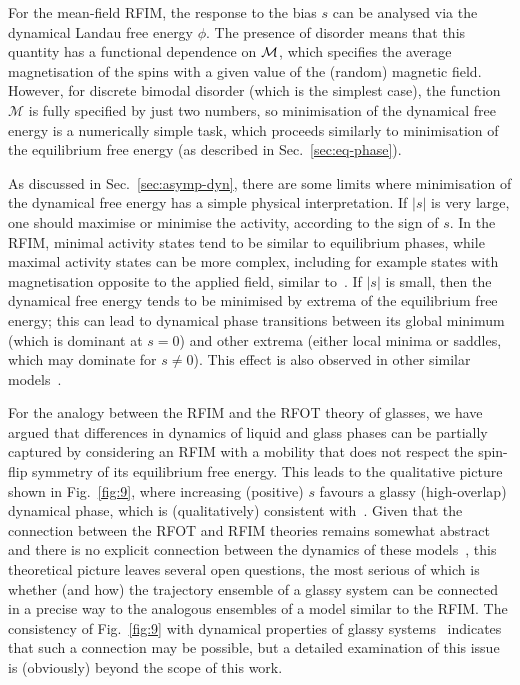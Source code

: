 \documentclass{iopart}
\newcommand{\mdis}[0]{\ensuremath{\mathcal{M}}}
\begin{document}
For the mean-field RFIM, the response to the bias $s$ can be analysed via the dynamical Landau free energy $\phi$.  The presence of disorder means that this quantity has a functional dependence on $\cal M$, which specifies the average magnetisation of the spins with a given value of the (random) magnetic field.  However, for discrete bimodal disorder (which is the simplest case), the function $\mdis$ is fully specified by just two numbers, so minimisation of the dynamical free energy is a numerically simple task, which proceeds similarly to minimisation of the equilibrium free energy (as described in Sec.~\ref{sec:eq-phase}).

As discussed in Sec.~\ref{sec:asymp-dyn}, there are some limits where minimisation of the dynamical free energy has a simple physical interpretation.  If $|s|$ is very large, one should maximise or minimise the activity, according to the sign of $s$.  In the RFIM, minimal activity states tend to be similar to equilibrium phases, while maximal activity states can be more complex, including for example states with magnetisation opposite to the applied field, similar to~\cite{van2010second,GuiothJack2020}.  If $|s|$ is small, then the dynamical free energy tends to be minimised by extrema of the equilibrium free energy; this can lead to dynamical phase transitions between its global minimum (which is dominant at $s=0$) and other extrema (either local minima or saddles, which may dominate for $s\neq 0$).  This effect is also observed in other similar models~\cite{Jack2010rom,GuiothJack2020}.

For the analogy between the RFIM and the RFOT theory of glasses, we have argued that differences in dynamics of liquid and glass phases can be partially captured by considering an RFIM with a mobility that does not respect the spin-flip symmetry of its equilibrium free energy.  This leads to the qualitative picture shown in Fig.~\ref{fig:9}, where increasing (positive) $s$ favours a glassy (high-overlap) dynamical phase, which is (qualitatively) consistent with~\cite{hedges2009dynamic}.
%
Given that the connection between the RFOT and RFIM theories remains somewhat abstract and there is no explicit connection between the dynamics of these models~\cite{biroli2014random,biroli2018random1,biroli2018random2,franz2013glassy,franz2013universality}, this theoretical picture leaves several open questions, the most serious of which is whether (and how) the trajectory ensemble of a glassy system can be connected in a precise way to the analogous ensembles of a model similar to the RFIM.  The consistency of  Fig.~\ref{fig:9} with dynamical properties of glassy systems~\cite{hedges2009dynamic} indicates that such a connection may be possible, but a detailed examination of this issue is (obviously) beyond the scope of this work.
\end{document}

